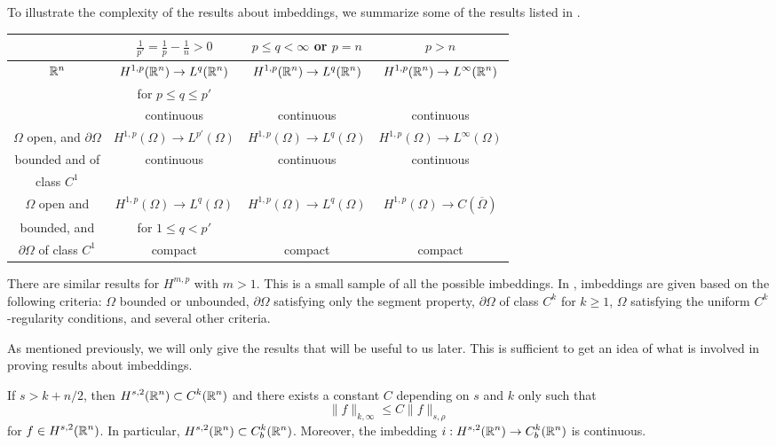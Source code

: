 To illustrate the complexity of the results about imbeddings, we
summarize some of the results listed in \cite{Br}.
\begin{center}
\begin{tabular}{c|c|c|c}
& $\displaystyle \frac{1}{p'} = \frac{1}{p} - \frac{1}{n} > 0$
& $p\leq q < \infty$ or $p = n$ & $ p > n$ \\
\hline  
\rule{0pt}{1.2em} $\mathbb{R}^n$ & $\displaystyle H^{1,p}(\mathbb{R}^n)
 \rightarrow L^{q}(\mathbb{R}^n)$
& $\displaystyle H^{1,p}(\mathbb{R}^n) \rightarrow L^{q}(\mathbb{R}^n)$
& $\displaystyle H^{1,p}(\mathbb{R}^n) \rightarrow L^{\infty}(\mathbb{R}^n)$ \\
& for $p \leq q \leq p'$ & & \\
& continuous & continuous & continuous \\
\hline
\rule{0pt}{1.2em} $\Omega$ open, and $\partial \Omega$
& $\displaystyle H^{1,p}(\Omega) \rightarrow L^{p'}(\Omega)$
& $\displaystyle H^{1,p}(\Omega) \rightarrow L^{q}(\Omega)$
& $\displaystyle H^{1,p}(\Omega) \rightarrow L^{\infty}(\Omega)$ \\
bounded and of & continuous & continuous & continuous \\
class $C^1$ & & & \\
\hline
\rule{0pt}{1.2em} $\Omega$ open and
& $\displaystyle H^{1,p}(\Omega) \rightarrow L^{q}(\Omega)$
& $\displaystyle H^{1,p}(\Omega) \rightarrow L^{q}(\Omega)$
& $\displaystyle H^{1,p}(\Omega) \rightarrow C(\overline{\Omega})$ \\
bounded, and & for $1 \leq q < p'$ & & \\
$\partial \Omega$ of class $\displaystyle C^1$ & compact & compact & compact \\
\hline
\end{tabular}
\end{center}
There are similar results for $\displaystyle H^{m,p}$ with $m>1$.
This is a small sample of all the possible imbeddings.  In \cite{Ad},
imbeddings are given based on the following criteria: $\Omega$ bounded or
unbounded, $\partial \Omega$ satisfying only the segment property,
$\partial \Omega$ of class $\displaystyle C^k$ for $k\geq 1$, $\Omega$
satisfying the uniform $\displaystyle C^k$-regularity conditions, and
several other criteria.

As mentioned previously, we will only give the results that will be
useful to us later.  This is sufficient to get an idea of what is
involved in proving results about imbeddings.

\begin{theorem} \label{sob_TheSobLemma}
If $s >k +n/2$, then $\displaystyle H^{s,2}(\mathbb{R}^n) \subset C^k(\mathbb{R}^n)$ and there
exists a constant $C$ depending on $s$ and $k$ only such that
\begin{equation} \label{sob_sob_lemma_max}
\|f\|_{k,\infty} \leq C \|f\|_{s,\rho}
\end{equation}
for $\displaystyle f \in H^{s,2}(\mathbb{R}^n)$.
In particular, $\displaystyle H^{s,2}(\mathbb{R}^n) \subset C_b^k(\mathbb{R}^n)$.
Moreover, the imbedding $\displaystyle i:H^{s,2}(\mathbb{R}^n) \to C_b^k(\mathbb{R}^n)$
is continuous.  
\end{theorem}

